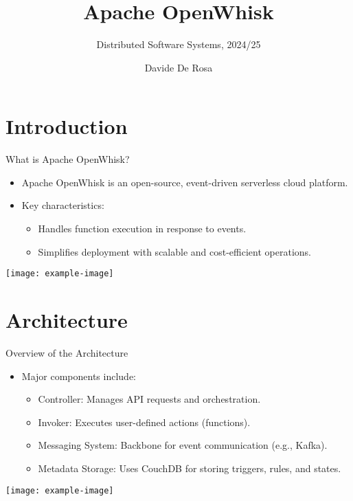 \documentclass[aspectratio=169]{beamer}
\title{Apache OpenWhisk}
\subtitle{Distributed Software Systems, 2024/25}
\author{Davide De Rosa}
\date{}
\begin{document}
\begin{frame}[plain]
    \titlepage
\end{frame}

\section{Introduction}
\begin{frame}{What is Apache OpenWhisk?}
    \begin{itemize}
        \item Apache OpenWhisk is an open-source, event-driven serverless cloud platform.
        \item Key characteristics:
        \begin{itemize}
            \item Handles function execution in response to events.
            \item Simplifies deployment with scalable and cost-efficient operations.
        \end{itemize}
    \end{itemize}
    \centering
    \texttt{[image: example-image]} %
\end{frame}

\section{Architecture}

\begin{frame}{Overview of the Architecture}
    \begin{itemize}
        \item Major components include:
        \begin{itemize}
            \item Controller: Manages API requests and orchestration.
            \item Invoker: Executes user-defined actions (functions).
            \item Messaging System: Backbone for event communication (e.g., Kafka).
            \item Metadata Storage: Uses CouchDB for storing triggers, rules, and states.
        \end{itemize}
    \end{itemize}
    \centering
    \texttt{[image: example-image]} %
\end{frame}
\end{document}
